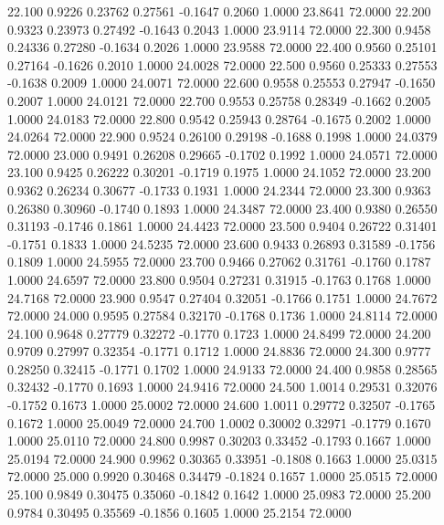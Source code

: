   22.100   0.9226   0.23762   0.27561  -0.1647   0.2060   1.0000  23.8641  72.0000
  22.200   0.9323   0.23973   0.27492  -0.1643   0.2043   1.0000  23.9114  72.0000
  22.300   0.9458   0.24336   0.27280  -0.1634   0.2026   1.0000  23.9588  72.0000
  22.400   0.9560   0.25101   0.27164  -0.1626   0.2010   1.0000  24.0028  72.0000
  22.500   0.9560   0.25333   0.27553  -0.1638   0.2009   1.0000  24.0071  72.0000
  22.600   0.9558   0.25553   0.27947  -0.1650   0.2007   1.0000  24.0121  72.0000
  22.700   0.9553   0.25758   0.28349  -0.1662   0.2005   1.0000  24.0183  72.0000
  22.800   0.9542   0.25943   0.28764  -0.1675   0.2002   1.0000  24.0264  72.0000
  22.900   0.9524   0.26100   0.29198  -0.1688   0.1998   1.0000  24.0379  72.0000
  23.000   0.9491   0.26208   0.29665  -0.1702   0.1992   1.0000  24.0571  72.0000
  23.100   0.9425   0.26222   0.30201  -0.1719   0.1975   1.0000  24.1052  72.0000
  23.200   0.9362   0.26234   0.30677  -0.1733   0.1931   1.0000  24.2344  72.0000
  23.300   0.9363   0.26380   0.30960  -0.1740   0.1893   1.0000  24.3487  72.0000
  23.400   0.9380   0.26550   0.31193  -0.1746   0.1861   1.0000  24.4423  72.0000
  23.500   0.9404   0.26722   0.31401  -0.1751   0.1833   1.0000  24.5235  72.0000
  23.600   0.9433   0.26893   0.31589  -0.1756   0.1809   1.0000  24.5955  72.0000
  23.700   0.9466   0.27062   0.31761  -0.1760   0.1787   1.0000  24.6597  72.0000
  23.800   0.9504   0.27231   0.31915  -0.1763   0.1768   1.0000  24.7168  72.0000
  23.900   0.9547   0.27404   0.32051  -0.1766   0.1751   1.0000  24.7672  72.0000
  24.000   0.9595   0.27584   0.32170  -0.1768   0.1736   1.0000  24.8114  72.0000
  24.100   0.9648   0.27779   0.32272  -0.1770   0.1723   1.0000  24.8499  72.0000
  24.200   0.9709   0.27997   0.32354  -0.1771   0.1712   1.0000  24.8836  72.0000
  24.300   0.9777   0.28250   0.32415  -0.1771   0.1702   1.0000  24.9133  72.0000
  24.400   0.9858   0.28565   0.32432  -0.1770   0.1693   1.0000  24.9416  72.0000
  24.500   1.0014   0.29531   0.32076  -0.1752   0.1673   1.0000  25.0002  72.0000
  24.600   1.0011   0.29772   0.32507  -0.1765   0.1672   1.0000  25.0049  72.0000
  24.700   1.0002   0.30002   0.32971  -0.1779   0.1670   1.0000  25.0110  72.0000
  24.800   0.9987   0.30203   0.33452  -0.1793   0.1667   1.0000  25.0194  72.0000
  24.900   0.9962   0.30365   0.33951  -0.1808   0.1663   1.0000  25.0315  72.0000
  25.000   0.9920   0.30468   0.34479  -0.1824   0.1657   1.0000  25.0515  72.0000
  25.100   0.9849   0.30475   0.35060  -0.1842   0.1642   1.0000  25.0983  72.0000
  25.200   0.9784   0.30495   0.35569  -0.1856   0.1605   1.0000  25.2154  72.0000
